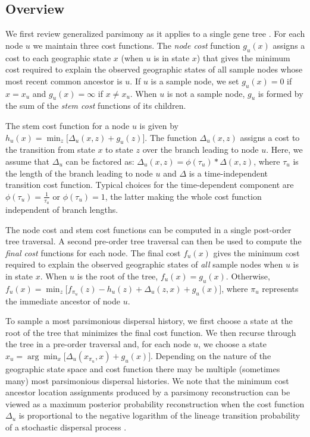 \subsection{Overview}

We first review generalized parsimony as it applies to a single gene tree
\citep{Sankoff_1975, Sankoff_Rousseau_1975}. For each node $u$ we maintain
three cost functions. The \textit{node cost} function $g_u(x)$ assigns a cost 
to each geographic state $x$ (when $u$ is in state $x$) that gives the minimum 
cost required to explain the observed geographic states of all sample nodes 
whose most recent common ancestor is $u$. If $u$ is a sample node, we set 
$g_u(x) = 0$ if $x = x_u$ and $g_u(x) = \infty$ if $x \neq x_u$. When $u$ is 
not a sample node, $g_u$ is formed by the sum of the \textit{stem cost} 
functions of its children.

The stem cost function for a node $u$ is given by
%
$h_u(x) = \min_z \bigl[ \Delta_u(x, z) + g_u(z) \bigr]$.
%
The function $\Delta_u(x, z)$ assigns a cost to the transition from state $x$ to
state $z$ over the branch leading to node $u$. Here, we assume that $\Delta_u$
can be factored as:
%
$\Delta_u(x,z) = \phi(\tau_u) * \Delta(x,z)$,
%
where $\tau_u$ is the length of the branch leading to node $u$ and $\Delta$ is
a time-independent transition cost function. Typical choices for the
time-dependent component are $\phi(\tau_u) = \frac{1}{\tau_u}$ or 
$\phi(\tau_u) = 1$, the latter making the whole cost function independent of
branch lengths.

The node cost and stem cost functions can be computed in a single post-order
tree traversal. A second pre-order tree traversal can then be used to compute
the \textit{final cost} functions for each node. The final cost $f_u(x)$
gives the minimum cost required to explain the observed geographic states of
\emph{all} sample nodes when $u$ is in state $x$. When $u$ is the root of the
tree, $f_u(x) = g_u(x)$. Otherwise, 
%
$f_u(x) = \min_z \bigl[ f_{\pi_u}(z) - h_u(z) + \Delta_u(z,x) + g_u(x) \bigr]$,
%
where $\pi_u$ represents the immediate ancestor of node $u$.

To sample a most parsimonious dispersal history, we first choose a state at the
root of the tree that minimizes the final cost function. We then recurse through 
the tree in a pre-order traversal and, for each node $u$, we choose a state
$x_u = \arg\min_x \bigl[\Delta_u(x_{\pi_u}, x) + g_u(x)\bigr]$. Depending on the
nature of the geographic state space and cost function there may be multiple
(sometimes many) most parsimonious dispersal histories. We note that the 
minimum cost ancestor location assignments produced by a parsimony 
reconstruction can be viewed as a maximum posterior probability reconstruction 
when the cost function $\Delta_u$ is proportional to the negative logarithm of 
the lineage transition probability of a stochastic dispersal process 
\citep{Maddison_1991}.

